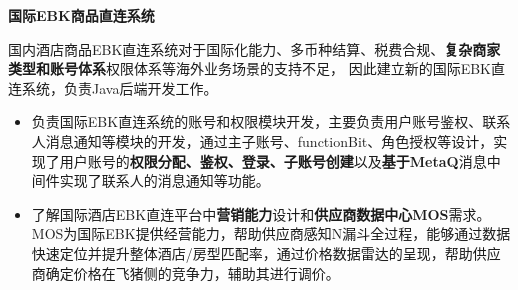 \documentclass{resume}
\begin{document}
  \textbf{国际EBK商品直连系统} 
   \begin{spacing}{1.2} 
  国内酒店商品EBK直连系统对于国际化能力、多币种结算、税费合规、\textbf{复杂商家类型和账号体系}权限体系等海外业务场景的支持不足，
  因此建立新的国际EBK直连系统，负责Java后端开发工作。

  \begin{itemize}
    \item 负责国际EBK直连系统的账号和权限模块开发，主要负责用户账号鉴权、联系人消息通知等模块的开发，通过主子账号、functionBit、角色授权等设计，实现了用户账号的\textbf{权限分配、鉴权、登录、子账号创建}以及\textbf{基于MetaQ}消息中间件实现了联系人的消息通知等功能。
    \item 了解国际酒店EBK直连平台中\textbf{营销能力}设计和\textbf{供应商数据中心MOS}需求。MOS为国际EBK提供经营能力，帮助供应商感知N漏斗全过程，能够通过数据快速定位并提升整体酒店/房型匹配率，通过价格数据雷达的呈现，帮助供应商确定价格在飞猪侧的竞争力，辅助其进行调价。
  \end{itemize}
  \end{spacing}

\end{document}
